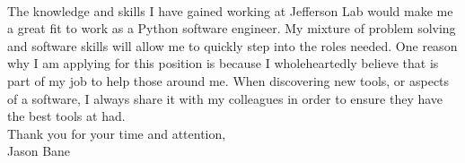 \documentclass[12pt,letterpaper]{article}
\begin{document}
\paragraph{}The knowledge and skills I have gained working at Jefferson Lab would make me a great fit to work as a Python software engineer. My mixture of problem solving and software skills will allow me to quickly step into the roles needed. One reason why I am applying for this position is because I wholeheartedly believe that is part of my job to help those around me. When discovering new tools, or aspects of a software, I always share it with my colleagues in order to ensure they have the best tools at had. 
\\

\noindent Thank you for your time and attention,\\
\noindent Jason Bane
\end{document}
